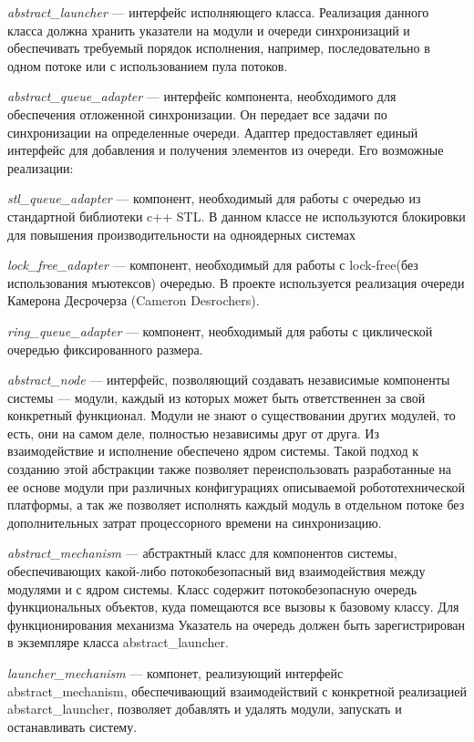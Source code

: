 \textit{abstract\_launcher} --- интерфейс исполняющего класса. Реализация данного класса должна хранить указатели на модули и очереди синхронизаций и обеспечивать требуемый порядок исполнения, например, последовательно в одном потоке или с использованием пула потоков.

\textit{abstract\_queue\_adapter} --- интерфейс компонента, необходимого для обеспечения отложенной синхронизации. Он передает все задачи по синхронизации на определенные очереди. Адаптер предоставляет единый интерфейс для добавления и получения элементов из очереди. Его возможные реализации:

\textit{stl\_queue\_adapter} --- компонент, необходимый для работы с очередью из стандартной библиотеки c++ STL. В данном классе не используются блокировки для повышения производительности на одноядерных системах

\textit{lock\_free\_adapter} --- компонент, необходимый для работы с lock-free(без использования мъютексов) очередью. В проекте используется реализация очереди Камерона Десрочерза (Cameron Desrochers).

\textit{ring\_queue\_adapter} --- компонент, необходимый для работы с  циклической очередью фиксированного размера.

\textit{abstract\_node} --- интерфейс, позволяющий создавать независимые компоненты системы --- модули, каждый из которых может быть ответственнен за свой конкретный функционал. Модули не знают о существовании других модулей, то есть, они на самом деле, полностью независимы друг от друга. Из взаимодействие и исполнение обеспечено ядром системы. Такой подход к созданию этой абстракции также позволяет переиспользовать разработанные на ее основе модули при различных конфигурациях описываемой робототехнической платформы, а так же позволяет исполнять каждый модуль в отдельном потоке без дополнительных затрат процессорного времени на синхронизацию. 

\textit{abstract\_mechanism} --- абстрактный класс для компонентов системы, обеспечивающих какой-либо потокобезопасный вид взаимодействия между модулями и с ядром системы. Класс содержит потокобезопасную очередь функциональных объектов, куда помещаются все вызовы к базовому классу. Для функционирования механизма Указатель на очередь должен быть зарегистрирован в экземпляре класса abstract\_launcher.

\textit{launcher\_mechanism} --- компонет, реализующий интерфейс abstract\_mechanism, обеспечивающий взаимодействий с конкретной реализацией abstarct\_launcher, позволяет добавлять и удалять модули, запускать и останавливать систему.

